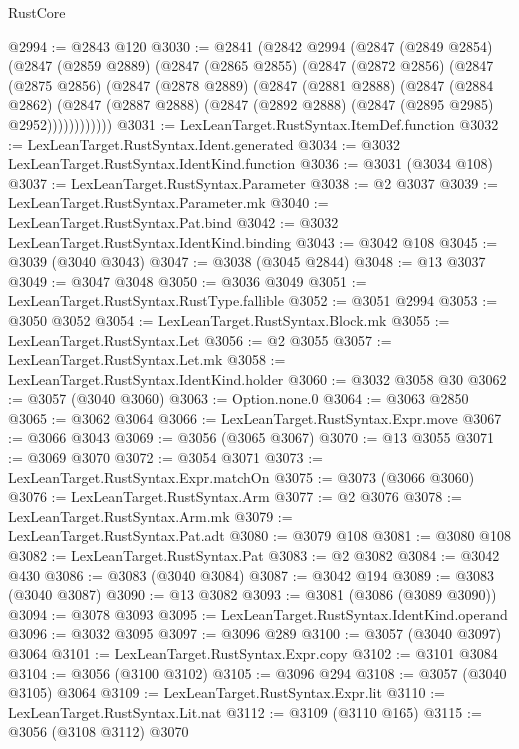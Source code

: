 \begin{lexlean}{RustCore}
\begin{coremodule}
@2994 := @2843 @120
@3030 := @2841
    (@2842
      @2994
      (@2847
        (@2849 @2854)
        (@2847
          (@2859 @2889)
          (@2847
            (@2865 @2855)
            (@2847
              (@2872 @2856)
              (@2847
                (@2875 @2856)
                (@2847
                  (@2878 @2889)
                  (@2847
                    (@2881 @2888)
                    (@2847
                      (@2884 @2862)
                      (@2847
                        (@2887 @2888)
                        (@2847 (@2892 @2888) (@2847 (@2895 @2985) @2952))))))))))))
@3031 := LexLeanTarget.RustSyntax.ItemDef.function
@3032 := LexLeanTarget.RustSyntax.Ident.generated
@3034 := @3032 LexLeanTarget.RustSyntax.IdentKind.function
@3036 := @3031 (@3034 @108)
@3037 := LexLeanTarget.RustSyntax.Parameter
@3038 := @2 @3037
@3039 := LexLeanTarget.RustSyntax.Parameter.mk
@3040 := LexLeanTarget.RustSyntax.Pat.bind
@3042 := @3032 LexLeanTarget.RustSyntax.IdentKind.binding
@3043 := @3042 @108
@3045 := @3039 (@3040 @3043)
@3047 := @3038 (@3045 @2844)
@3048 := @13 @3037
@3049 := @3047 @3048
@3050 := @3036 @3049
@3051 := LexLeanTarget.RustSyntax.RustType.fallible
@3052 := @3051 @2994
@3053 := @3050 @3052
@3054 := LexLeanTarget.RustSyntax.Block.mk
@3055 := LexLeanTarget.RustSyntax.Let
@3056 := @2 @3055
@3057 := LexLeanTarget.RustSyntax.Let.mk
@3058 := LexLeanTarget.RustSyntax.IdentKind.holder
@3060 := @3032 @3058 @30
@3062 := @3057 (@3040 @3060)
@3063 := Option.none.{0}
@3064 := @3063 @2850
@3065 := @3062 @3064
@3066 := LexLeanTarget.RustSyntax.Expr.move
@3067 := @3066 @3043
@3069 := @3056 (@3065 @3067)
@3070 := @13 @3055
@3071 := @3069 @3070
@3072 := @3054 @3071
@3073 := LexLeanTarget.RustSyntax.Expr.matchOn
@3075 := @3073 (@3066 @3060)
@3076 := LexLeanTarget.RustSyntax.Arm
@3077 := @2 @3076
@3078 := LexLeanTarget.RustSyntax.Arm.mk
@3079 := LexLeanTarget.RustSyntax.Pat.adt
@3080 := @3079 @108
@3081 := @3080 @108
@3082 := LexLeanTarget.RustSyntax.Pat
@3083 := @2 @3082
@3084 := @3042 @430
@3086 := @3083 (@3040 @3084)
@3087 := @3042 @194
@3089 := @3083 (@3040 @3087)
@3090 := @13 @3082
@3093 := @3081 (@3086 (@3089 @3090))
@3094 := @3078 @3093
@3095 := LexLeanTarget.RustSyntax.IdentKind.operand
@3096 := @3032 @3095
@3097 := @3096 @289
@3100 := @3057 (@3040 @3097) @3064
@3101 := LexLeanTarget.RustSyntax.Expr.copy
@3102 := @3101 @3084
@3104 := @3056 (@3100 @3102)
@3105 := @3096 @294
@3108 := @3057 (@3040 @3105) @3064
@3109 := LexLeanTarget.RustSyntax.Expr.lit
@3110 := LexLeanTarget.RustSyntax.Lit.nat
@3112 := @3109 (@3110 @165)
@3115 := @3056 (@3108 @3112) @3070

\end{coremodule}
\end{lexlean}
